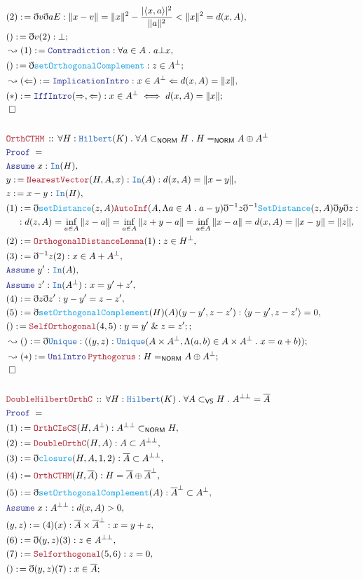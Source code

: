 \documentclass[12pt]{scrartcl}
\newcommand{\TYPE}[1]{\textcolor{NavyBlue}{\mathtt{#1}}}
\newcommand{\FUNC}[1]{\textcolor{Cerulean}{\mathtt{#1}}}
\newcommand{\LOGIC}[1]{\textcolor{Blue}{\mathtt{#1}}}
\newcommand{\THM}[1]{\textcolor{Maroon}{\mathtt{#1}}}
\renewcommand{\.}{\; . \;}
\newcommand{\de}{: \kern 0.1pc =}
\newcommand{\Theorem}[2]{& \THM{#1} \, :: \, #2 \\ & \Proof = \\ }
\newcommand{\NewLine}{\\ & \kern 1pc}
\newcommand{\Page}[1]{\begin{align*} #1 \end{align*} \newpage   }
\newcommand{ \bd }{ \ByDef }
\renewcommand{\And}{\; \& \;}
\newcommand{\Say}[3]{& #1 \de #2 : #3, \\}
\newcommand{\Conclude}[3]{& #1 \de #2 : #3; \\}
\newcommand{\Derive}[3]{& \leadsto #1 \de #2 : #3, \\}
\newcommand{\DeriveConclude}[3]{& \leadsto #1 \de #2 : #3 ; \\}
\newcommand{\A}{\LOGIC{Assume} \;}
\newcommand{\Assume}[2]{& \A #1 : #2, \\}
\newcommand{\QED}{\; \square}
\newcommand{\EndProof}{& \QED \\}
\newcommand{\ByDef}{\eth}
\newcommand{\Proof}{\LOGIC{Proof} \; }
\newcommand{\Hilbert}{\TYPE{Hilbert}}
\newcommand{\NORM}{\textsf{NORM}}
\begin{document}
\Page{
\Say{(2)}{\bd v \bd a E}{\| x - v \| = \|x \|^2 - \frac{|\langle x, a \rangle|^2}{\|a\|^2}  < \| x \|^2 = d(x,A) } 
\Conclude{()}{\bd v (2)}{\bot}
\Derive{(1)}{\LOGIC{Contradiction}}{\forall a \in A \. a \bot x}
\Conclude{()}{\bd \FUNC{setOrthogonalComplement}}{z \in A^\bot}
\Derive{(\Leftarrow)}{\LOGIC{ImplicationIntro}}{x \in A^\bot \Leftarrow d(x,A) = \| x \|}
\Conclude{(*)}{\LOGIC{IffIntro}(\Rightarrow,\Leftarrow)}{x \in A^\bot \iff d(x,A) = \| x \|}
\EndProof
\\
\Theorem{OrthCTHM}{\forall H : \Hilbert(K) \. \forall A \subset_{\NORM} H \. H =_\NORM A \oplus A^\bot}
\Assume{x}{\TYPE{In}(H)}
\Say{y}{\THM{NearestVector}(H,A,x)}{\TYPE{In}(A) : d(x,A) = \| x - y \|}
\Say{z}{x - y}{\TYPE{In}(H)}
\Say{(1)}{\bd \FUNC{setDistance}(z,A) \THM{AutoInf}(A,\Lambda a \in A \. a - y)
\bd^{-1} z  \bd^{-1} \FUNC{SetDistance}(z,A) \bd y \bd z
 }{
\NewLine : 
 d(z,A) = \inf_{a \in A} \| z - a \| = \inf_{a \in A} \| z + y - a \|
=  \inf_{a \in A} \| x - a \| = d(x,A) = \| x - y \| = \| z \|
}
\Say{(2)}{\THM{OrthogonalDistanceLemma}(1)}{z \in H^\bot}
\Say{(3)}{\bd^{-1} z (2)}{x \in A + A^\bot}
\Assume{y'}{\TYPE{In}(A)}
\Assume{z'}{\TYPE{In}(A^\bot) : x = y' + z'}
\Say{(4)}{\bd z \bd z'}{y - y' = z - z'}
\Say{(5)}{\bd \FUNC{setOrthogonalComplement}(H)(A)(y - y',z - z')}{\langle y - y', z - z' \rangle = 0}
\Conclude{()}{ \THM{SelfOrthogonal}(4,5)}{y = y' \And z = z' ;}
\DeriveConclude{()}{\bd\TYPE{Unique}}{((y,z) : \TYPE{Unique}(A \times A^\bot, \Lambda (a,b) \in A \times A^\bot \. x = a + b ))}
\DeriveConclude{(*)}{\LOGIC{UniIntro} \, \THM{Pythogorus}}{H =_\NORM A \oplus A^\bot }
\EndProof
\\
\Theorem{DoubleHilbertOrthC}{\forall H : \Hilbert(K) \. \forall A \subset_{\mathsf{VS} } H \.
A^{\bot \bot} = \overline{A} 
}
\Say{(1)}{\THM{OrthCIsCS}(H,A^\bot)}{A^{\bot\bot} \subset_\NORM H }
\Say{(2)}{\THM{DoubleOrthC}(H,A)}{A \subset A^{\bot \bot}}
\Say{(3)}{ \bd \FUNC{closure}(H,A,1,2)}{  \overline{A} \subset A^{\bot \bot}}
\Say{(4)}{\THM{OrthCTHM}(H,\overline{A})}{H = \overline{A} \oplus \overline{A}^\bot}
\Say{(5)}{\bd \FUNC{setOrthogonalComplement}(A)}{ \overline{A}^\bot \subset A^\bot }
\Assume{x}{A^{\bot\bot} : d(x,A) > 0 }
\Say{(y,z)}{(4)(x)}{\overline{A} \times \overline{A}^{\bot}: x = y + z}
\Say{(6)}{\bd(y,z)(3)}{z \in A^{\bot \bot}}
\Say{(7)}{\THM{Selforthogonal}(5,6)}{ z = 0}
\Conclude{()}{\bd(y,z)(7)}{x \in \overline{A}}
}
\end{document}
